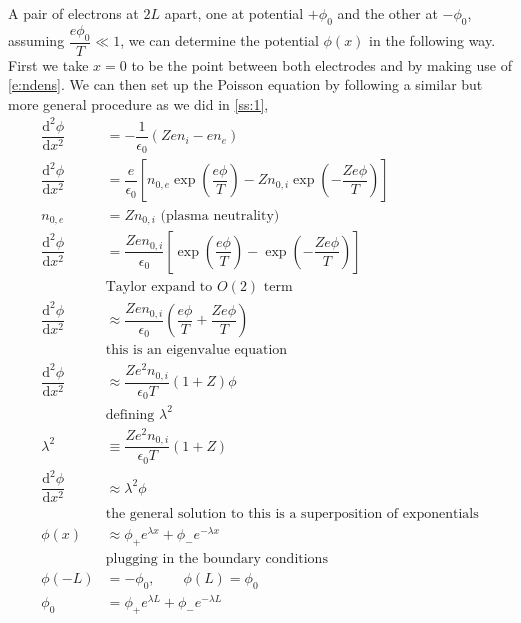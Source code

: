 \documentclass[10pt,a4paper]{article}
\begin{document}
	A pair of electrons at $2L$ apart, one at potential $+\phi_{0}$ and the other at $-\phi_{0}$, assuming $\dfrac{e \phi_{0}}{T} \ll 1$, we can determine the potential $\phi(x)$ in the following way. First we take $x=0$ to be the point between both electrodes and by making use of \cref{e:ndens}. We can then set up the Poisson equation by following a similar but more general procedure as we did in \cref{ss:1},
	\begin{subequations}
		\begin{align}
			\dfrac{\mathrm{d}^{2} \phi}{\mathrm{d} x^{2}} &= -\dfrac{1}{\epsilon_{0}} \left(Z e n_{i} -e n_{e}\right)\\
			\dfrac{\mathrm{d}^{2} \phi}{\mathrm{d} x^{2}} &= \dfrac{e}{\epsilon_{0}} \left[n_{0,e} \exp\left(\dfrac{e \phi}{T}\right) - Z n_{0,i} \exp\left(-\dfrac{Z e \phi}{T}\right)\right]\\
			n_{0,e} &= Z n_{0,i} \textrm{ (plasma neutrality)} \\
			\dfrac{\mathrm{d}^{2} \phi}{\mathrm{d} x^{2}} &= \dfrac{Z e n_{0,i}}{\epsilon_{0}} \left[\exp\left(\dfrac{e \phi}{T}\right) - \exp\left(-\dfrac{Z e \phi}{T}\right)\right] \\
			&\textrm{Taylor expand to $O(2)$ term} \nonumber \\
			\dfrac{\mathrm{d}^{2} \phi}{\mathrm{d} x^{2}} &\approx \dfrac{Z e n_{0,i}}{\epsilon_{0}} \left(\dfrac{e \phi}{T} + \dfrac{Z e \phi}{T}\right) \\
			&\textrm{this is an eigenvalue equation} \nonumber \\
			\dfrac{\mathrm{d}^{2} \phi}{\mathrm{d} x^{2}} &\approx \dfrac{Z e^{2} n_{0,i}}{\epsilon_{0} T} (1 + Z) \phi \\
			&\textrm{defining $\lambda^{2}$} \nonumber\\
			\lambda^{2} &\equiv \dfrac{Z e^{2} n_{0,i}}{\epsilon_{0} T} (1 + Z) \nonumber\\
			\dfrac{\mathrm{d}^{2} \phi}{\mathrm{d} x^{2}} &\approx \lambda^{2} \phi \\
			&\textrm{the general solution to this is a superposition of exponentials}\nonumber\\
			\phi(x) &\approx \phi_{+} e^{\lambda x} + \phi_{-} e^{-\lambda x} \\
			&\textrm{plugging in the boundary conditions} \nonumber\\
			\phi(-L) &= -\phi_{0}, \qquad \phi(L) = \phi_{0} \\
			\phi_{0} &= \phi_{+} e^{\lambda L} + \phi_{-} e^{-\lambda L} \\

\end{align}
\end{subequations}
\end{document}
